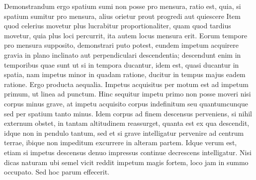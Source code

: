 Demonstrandum ergo spatium sumi non posse pro mensura,  ratio est, quia, si  spatium sumitur pro mensura, alius orietur  prout progredi aut quiescere  Item quod celerius movetur plus lucrabitur  proportionaliter, quam quod tardius movetur, quia plus loci percurrit, ita autem locus mensura erit. Eorum tempore pro mensura supposito, demonstrari puto potest, eundem impetum\protect{} acquirere gravia\protect{} in plano inclinato\protect{} aut perpendiculari descendentia; descendunt enim in temporibus quae sunt ut  si in tempora ducantur, idem est, quasi ducantur in spatia, nam  impetus\protect{} minor in quadam ratione, ducitur in tempus majus eadem ratione. Ergo producta aequalia.
\pend 
\newpage
\pstart Impetus acquisitus per motum est ad impetum\protect{} primum, ut linea ad punctum. Hinc sequitur impetu\protect{} primo non posse moveri nisi corpus minus grave\protect{}, at impetu\protect{} acquisito corpus indefinitum seu quantumcunque sed per spatium tanto minus.
\pend 
\pstart Idem corpus ad finem descensus perveniens, si nihil externum obstet, in tantam altitudinem reassurget, quanta est ex qua descendit, idque non in pendulo\protect{} tantum, sed et si grave\protect{} intelligatur pervenire ad centrum terrae, ibique non impeditum excurrere in alteram partem. Idque verum est, etiam si impetus\protect{} descensus denuo impressus continue decrescens intelligatur. Nisi dicas naturam ubi semel vicit reddit impetum\protect{} magis fortem, loco jam in summo occupato. Sed hoc parum effecerit. 
\pend 
\count{}
\count{}
\count{}
 


 


 


 

